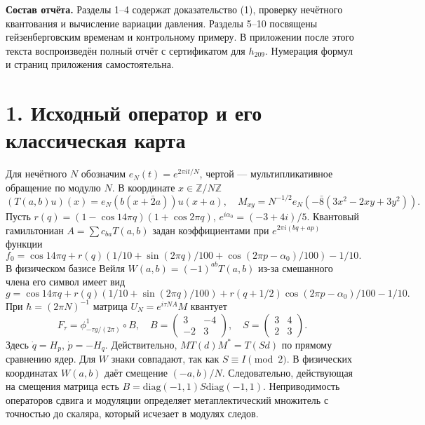 \documentclass[11pt,a4paper]{article}
\newcommand{\Z}{\mathbb Z}
\newcommand{\sect}[1]{\section*{\sffamily\color{ink}#1}}
\newcommand{\subt}[1]{\par\medskip\noindent\textbf{#1.}\quad}
\begin{document}
\subt{Состав отчёта} Разделы 1--4 содержат доказательство (1), проверку нечётного квантования и вычисление вариации давления. Разделы 5--10 посвящены гейзенберговским временам и контрольному примеру. В приложении после этого текста воспроизведён полный отчёт с сертификатом для $h_{209}$. Нумерация формул и страниц приложения самостоятельна.
\newpage
\sect{1. Исходный оператор и его классическая карта}
Для нечётного $N$ обозначим $e_N(t)=e^{2\pi i t/N}$, чертой --- мультипликативное обращение по модулю $N$. В координате $x\in\Z/N\Z$
\[
 (T(a,b)u)(x)=e_N(b(x+\bar2 a))u(x+a),\quad
 M_{xy}=N^{-1/2}e_N(-\bar8(3x^2-2xy+3y^2)).
\]
Пусть $r(q)=(1-\cos14\pi q)(1+\cos2\pi q)$, $e^{i\alpha_0}=(-3+4i)/5$. Квантовый гамильтониан $A=\sum c_{ba}T(a,b)$ задан коэффициентами при $e^{2\pi i(bq+ap)}$ функции
\[
 f_0=\cos14\pi q+r(q)(1/10+\sin(2\pi q)/100+
                      \cos(2\pi p-\alpha_0)/100)-1/10 .
\]
В физическом базисе Вейля $W(a,b)=(-1)^{ab}T(a,b)$ из-за смешанного члена его символ имеет вид
\[
 g=\cos14\pi q+r(q)(1/10+\sin(2\pi q)/100)
      +r(q+1/2)\cos(2\pi p-\alpha_0)/100-1/10 .
\]
При $\hbar=(2\pi N)^{-1}$ матрица $U_N=e^{i\tau NA}M$ квантует
\[
 F_\tau=\phi^1_{-\tau g/(2\pi)}\circ B,\quad
 B=\begin{pmatrix}3&-4\\-2&3\end{pmatrix},\quad
 S=\begin{pmatrix}3&4\\2&3\end{pmatrix} .
\]
Здесь $\dot q=H_p$, $\dot p=-H_q$. Действительно, $M T(d)M^*=T(Sd)$ по прямому сравнению ядер. Для $W$ знаки совпадают, так как $S\equiv I\pmod2$. В физических координатах $W(a,b)$ даёт смещение $(-a,b)/N$. Следовательно, действующая на смещения матрица есть $B=\mathrm{diag}(-1,1)S\mathrm{diag}(-1,1)$. Неприводимость операторов сдвига и модуляции определяет метаплектический множитель с точностью до скаляра, который исчезает в модулях следов.
\end{document}
